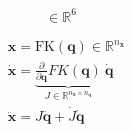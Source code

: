 \documentclass[11pt]{article}
\newcommand{\pd}[2][]{ \frac{\partial #1}{\partial #2}} %
\begin{document}
\[
\in\mathbb{R}^{6}
\]

\begin{align*}
  & \mathbf{x} = \text{FK}(\bm{q}) \in\mathbb{R}^{n_\mathbf{x}}\\
  & \dot{\mathbf{x}} = \underbrace{\pd{\bm{q}}FK(\bm{q})}_{J\in\mathbb{R}^{n_{\mathbf{x}}\times n_{\bm{q}}}} \ \dot{\bm{q}}\\
  & \ddot{\mathbf{x}} = J\ddot{\bm{q}} + \dot{J} \dot{\bm{q}}
\end{align*}
\end{document}
